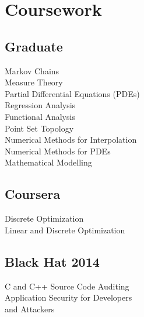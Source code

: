 \documentclass[letterpaper]{clinton-resume}
\begin{document}
\begin{minipage}[t]{0.33\textwidth}
\section{Coursework}

\subsection{Graduate}
Markov Chains\\
Measure Theory\\
Partial Differential Equations (PDEs)\\
Regression Analysis\\
Functional Analysis\\
Point Set Topology\\
Numerical Methods for Interpolation\\
Numerical Methods for PDEs\\
Mathematical Modelling\\
\subsection{Coursera}
Discrete Optimization\\
Linear and Discrete Optimization\\
\subsection{Black Hat 2014}
C and C++ Source Code Auditing\\
Application Security for Developers\\and Attackers\\
\end{minipage}
\end{document}
